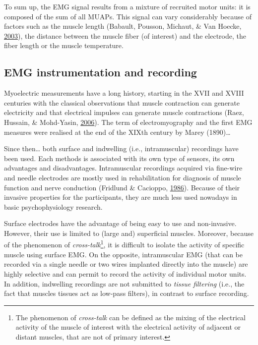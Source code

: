 \documentclass[a4paper,12pt,twoside,openright,oldfontcommands]{memoir}
\let\rmarkdownfootnote\footnote%
\def\footnote{\protect\rmarkdownfootnote}
\begin{document}
To sum up, the EMG signal results from a mixture of recruited motor
units: it is composed of the sum of all MUAPs. This signal can vary
considerably because of factors such as the muscle length (Babault,
Pousson, Michaut, \& Van Hoecke,
\protect\hyperlink{ref-babault_effect_2003}{2003}), the distance between
the muscle fiber (of interest) and the electrode, the fiber length or
the muscle temperature.

\subsection{EMG instrumentation and
recording}\label{emg-instrumentation-and-recording}

Myoelectric measurements have a long history, starting in the XVII and
XVIII centuries with the classical observations that muscle contraction
can generate electricity and that electrical impulses can generate
muscle contractions (Raez, Hussain, \& Mohd-Yasin,
\protect\hyperlink{ref-raez_techniques_2006}{2006}). The term of
electromyography and the first EMG measures were realised at the end of
the XIXth century by Marey (1890)\ldots{}

Since then\ldots{} both surface and indwelling (i.e., intramuscular)
recordings have been used. Each methods is associated with its own type
of sensors, its own advantages and disadvantages. Intramuscular
recordings acquired via fine-wire and needle electrodes are mostly used
in rehabilitation for diagnosis of muscle function and nerve conduction
(Fridlund \& Cacioppo,
\protect\hyperlink{ref-fridlund_guidelines_1986}{1986}). Because of
their invasive properties for the participants, they are much less used
nowadays in basic psychophysiology research.

Surface electrodes have the advantage of being easy to use and
non-invasive. However, their use is limited to (large and) superficial
muscles. Moreover, because of the phenomenon of
\emph{cross-talk}\footnote{The phenomenon of \emph{cross-talk} can be
  defined as the mixing of the electrical activity of the muscle of
  interest with the electrical activity of adjacent or distant muscles,
  that are not of primary interest.}, it is difficult to isolate the
activity of specific muscle using surface EMG. On the opposite,
intramuscular EMG (that can be recorded via a single needle or two wires
implanted directly into the muscle) are highly selective and can permit
to record the activity of individual motor units. In addition,
indwelling recordings are not submitted to \emph{tissue filtering}
(i.e., the fact that muscles tissues act as low-pass filters), in
contrast to surface recording.
\end{document}
